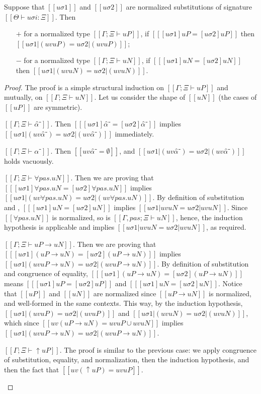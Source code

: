 \begin{lemma}
  \label{lemma:subst-eq-metavar}
  Suppose that $[[uσ1]]$ and $[[uσ2]]$ are 
  normalized substitutions of signature $[[Θ ⊢ uσi : Ξ]]$.
  Then 
  \begin{enumerate}
    \item [$+$] for a normalized type $[[Γ; Ξ ⊢ uP]]$, if $[[ [uσ1]uP = [uσ2]uP ]]$ then
      $[[uσ1|(uv uP)  = uσ2|(uv uP)]]$;
    \item [$-$] for a normalized type $[[Γ; Ξ ⊢ uN]]$, if $[[ [uσ1]uN = [uσ2]uN ]]$ then
      $[[uσ1|(uv uN)  = uσ2|(uv uN)]]$.
  \end{enumerate}
\end{lemma}
\begin{proof}
  The proof is a simple structural induction on 
  $[[Γ; Ξ ⊢ uP]]$ and mutually, on $[[Γ; Ξ ⊢ uN]]$.
  Let us consider the shape of $[[uN]]$ (the cases of $[[uP]]$ are symmetric).
  \begin{caseof}
    \item $[[Γ; Ξ ⊢ α̂⁻]]$. Then $[[ [uσ1]α̂⁻ = [uσ2]α̂⁻ ]]$
      implies $[[uσ1|(uv α̂⁻) = uσ2|(uv α̂⁻)]]$ immediately.
    \item $[[Γ; Ξ ⊢ α⁻]]$. Then $[[uv α̂⁻ = ∅]]$, and
      $[[uσ1|(uv α̂⁻)  = uσ2|(uv α̂⁻)]]$ holds vacuously.
    \item $[[Γ; Ξ ⊢ ∀pas.uN]]$. Then we are proving that
      $[[ [uσ1]∀pas.uN = [uσ2]∀pas.uN ]]$ implies $[[uσ1|(uv ∀pas.uN) = uσ2|(uv ∀pas.uN)]]$.
      By definition of substitution and , 
      $[[ [uσ1]uN = [uσ2]uN ]]$ implies $[[uσ1|uv uN = uσ2|uv uN]]$.
      Since $[[∀pas.uN]]$ is normalized, so is $[[Γ, pas; Ξ ⊢ uN]]$, 
      hence, the induction hypothesis is applicable and implies $[[uσ1|uv uN = uσ2|uv uN]]$,
      as required.
    \item $[[Γ; Ξ ⊢ uP → uN]]$. Then we are proving that
      $[[ [uσ1](uP → uN) = [uσ2](uP → uN) ]]$ implies $[[uσ1|(uv uP → uN) = uσ2|(uv uP → uN)]]$.
      By definition of substitution and congruence of equality, 
      $[[ [uσ1](uP → uN) = [uσ2](uP → uN) ]]$
      means $[[ [uσ1]uP = [uσ2]uP ]]$ and $[[ [uσ1]uN = [uσ2]uN ]]$.
      Notice that $[[uP]]$ and $[[uN]]$ are normalized since $[[uP → uN]]$ is normalized, 
      and well-formed in the same contexts.
      This way, by the induction hypothesis, 
      $[[uσ1|(uv uP) = uσ2|(uv uP)]]$ and $[[uσ1|(uv uN) = uσ2|(uv uN)]]$,
      which since $[[uv (uP → uN) = uv uP ∪ uv uN]]$ implies
      $[[uσ1|(uv uP → uN) = uσ2|(uv uP → uN)]]$.
    \item $[[Γ; Ξ ⊢ ↑uP]]$. The proof is similar to the previous case:
      we apply congruence of substitution, equality, and normalization,
      then the induction hypothesis, and then the fact that $[[uv (↑uP) = uv uP]]$.
  \end{caseof}
\end{proof}


